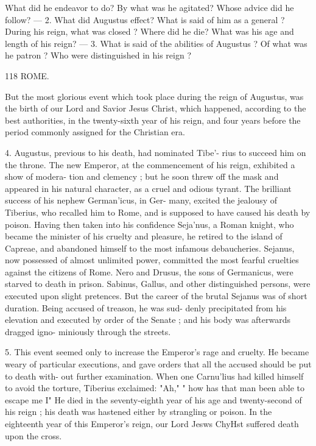 \documentclass[openany,a4paper]{memoir}
\begin{document}
What did he endeavor to do? By what was he agitated? Whose 
advice did he follow? — 2. What did Augustus effect? What is said 
of him as a general ? During his reign, what was closed ? Where did 
he die? What was his age and length of his reign? — 3. What is 
said of the abilities of Augustus ? Of what was he patron ? Who were 
distinguished in his reign ? 



118 ROME. 

But the most glorious event which took place during the reign 
of Augustus, was the birth of our Lord and Savior Jesus 
Christ, which happened, according to the best authorities, 
in the twenty-sixth year of his reign, and four years before the 
period commonly assigned for the Christian era. 

4. Augustus, previous to his death, had nominated Tibe'- 
rius to succeed him on the throne. The new Emperor, at 
the commencement of his reign, exhibited a show of modera- 
tion and clemency ; but he soon threw off the mask and 
appeared in his natural character, as a cruel and odious tyrant. 
The brilliant success of his nephew German'icus, in Ger- 
many, excited the jealousy of Tiberius, who recalled him to 
Rome, and is supposed to have caused his death by poison. 
Having then taken into his confidence Seja'nus, a Roman 
knight, who became the minister of his cruelty and pleasure, 
he retired to the island of Capreae, and abandoned himself to 
the most infamous debaucheries. Sejanus, now possessed of 
almost unlimited power, committed the most fearful cruelties 
against the citizens of Rome. Nero and Drusus, the sons 
of Germanicus, were starved to death in prison. Sabinus, 
Gallus, and other distinguished persons, were executed upon 
slight pretences. But the career of the brutal Sejanus was 
of short duration. Being accused of treason, he was sud- 
denly precipitated from his elevation and executed by order 
of the Senate ; and his body was afterwards dragged igno- 
miniously through the streets. 

5. This event seemed only to increase the Emperor's rage 
and cruelty. He became weary of particular executions, and 
gave orders that all the accused should be put to death with- 
out further examination. When one Carnu'lius had killed 
himself to avoid the torture, Tiberius exclaimed: "Ah," 
" how has that man been able to escape me I" He died in 
the seventy-eighth year of his age and twenty-second of his 
reign ; his death was hastened either by strangling or poison. 
In the eighteenth year of this Emperor's reign, our Lord Jesws 
ChyHst suffered death upon the cross. 
\end{document}

